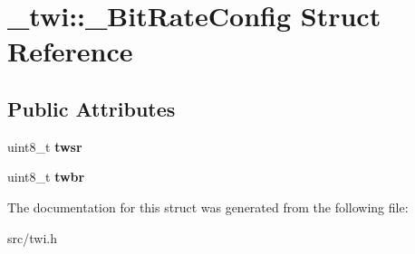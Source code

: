 \hypertarget{struct__twi_1_1__BitRateConfig}{}\section{\+\_\+twi\+:\+:\+\_\+\+Bit\+Rate\+Config Struct Reference}
\label{struct__twi_1_1__BitRateConfig}
\subsection*{Public Attributes}
\begin{DoxyCompactItemize}
\item 
uint8\+\_\+t {\bfseries twsr}\hypertarget{struct__twi_1_1__BitRateConfig_a7c3c8ecc3276d0f9e34474a6743d27f7}{}\label{struct__twi_1_1__BitRateConfig_a7c3c8ecc3276d0f9e34474a6743d27f7}

\item 
uint8\+\_\+t {\bfseries twbr}\hypertarget{struct__twi_1_1__BitRateConfig_aee21fcb17d9fc2bfde8498eb031f03e9}{}\label{struct__twi_1_1__BitRateConfig_aee21fcb17d9fc2bfde8498eb031f03e9}

\end{DoxyCompactItemize}


The documentation for this struct was generated from the following file\+:\begin{DoxyCompactItemize}
\item 
src/twi.\+h\end{DoxyCompactItemize}
